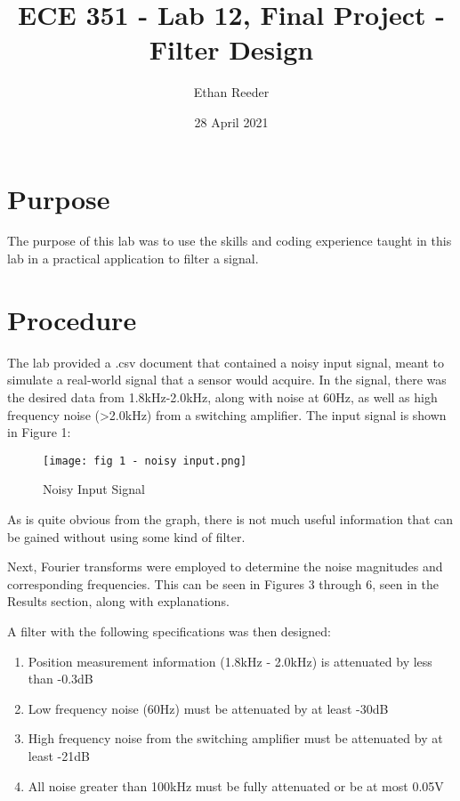 \documentclass[12pt]{article}
\title{ECE 351 - Lab 12, Final Project - Filter Design}
\author{Ethan Reeder}
\date{28 April 2021}
\begin{document}
\lstset{language=Python}

\maketitle

\newpage

\tableofcontents

\newpage

\section{Purpose}

The purpose of this lab was to use the skills and coding experience taught in this lab in a practical application to filter a signal.

\section{Procedure}

The lab provided a .csv document that contained a noisy input signal, meant to simulate a real-world signal that a sensor would acquire. In the signal, there was the desired data from 1.8kHz-2.0kHz, along with noise at 60Hz, as well as high frequency noise (>2.0kHz) from a switching amplifier. The input signal is shown in Figure 1:

\begin{figure}[h!]
    \centering
    \texttt{[image: fig 1 - noisy input.png]}
    \caption{Noisy Input Signal}
\end{figure}

As is quite obvious from the graph, there is not much useful information that can be gained without using some kind of filter.

Next, Fourier transforms were employed to determine the noise magnitudes and corresponding frequencies. This can be seen in Figures 3 through 6, seen in the Results section, along with explanations.

A filter with the following specifications was then designed:

\begin{enumerate}
    \item Position measurement information (1.8kHz - 2.0kHz) is attenuated by less than -0.3dB
    \item Low frequency noise (60Hz) must be attenuated by at least -30dB
    \item High frequency noise from the switching amplifier must be attenuated by at least -21dB
    \item All noise greater than 100kHz must be fully attenuated or be at most 0.05V
\end{enumerate}
\end{document}
